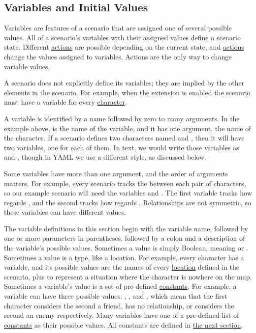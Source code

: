 \documentclass{nilreport}
\begin{document}
\newpage

\subsection{Variables and Initial Values} \label{sec:variables}

Variables are features of a scenario that are assigned one of several possible values. All of a scenario's variables with their assigned values define a scenario state. Different \hyperref[sec:actions]{actions} are possible depending on the current state, and \hyperref[sec:actions]{actions} change the values assigned to variables. Actions are the only way to change variable values.

A scenario does not explicitly define its variables; they are implied by the other elements in the scenario. For example, when the  extension is enabled the scenario must have a  variable for every \hyperref[sec:characters]{character}.

A variable is identified by a name followed by zero to many arguments. In the example above,  is the name of the variable, and it has one argument, the name of the character. If a scenario defines two characters named  and , then it will have two  variables, one for each of them. In text, we would write those variables as  and , though in YAML we use a different style, as discussed below.

Some variables have more than one argument, and the order of arguments matters. For example, every scenario tracks the  between each pair of characters, so our example scenario will need the variables  and . The first variable tracks how  regards , and the second tracks how  regards . Relationships are not symmetric, so these variables can have different values.

The variable definitions in this section begin with the variable name, followed by one or more parameters in parentheses, followed by a colon and a description of the variable's possible values. Sometimes a value is simply Boolean, meaning  or . Sometimes a value is a type, like a location. For example, every character has a  variable, and its possible values are the names of every \hyperref[sec:locations]{location} defined in the scenario, plus \None to represent a situation where the character is nowhere on the map. Sometimes a variable's value is a set of pre-defined \hyperref[sec:constants]{constants}. For example, a  variable can have three possible values: , \None, and , which mean that the first character considers the second a friend, has no relationship, or considers the second an enemy respectively. Many variables have one of a pre-defined list of \hyperref[sec:constants]{constants} as their possible values. All constants are defined in \hyperref[sec:constants]{the next section}.
\end{document}
